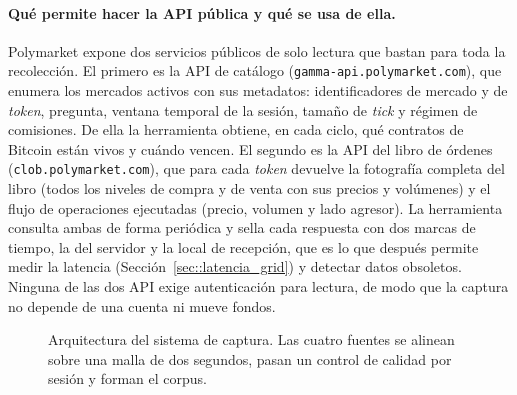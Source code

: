 \paragraph{Qué permite hacer la API pública y qué se usa de ella.} Polymarket expone dos
servicios públicos de solo lectura que bastan para toda la recolección. El primero es la API
de catálogo (\texttt{gamma-api.polymarket.com}), que enumera los mercados activos con sus
metadatos: identificadores de mercado y de \emph{token}, pregunta, ventana temporal de la
sesión, tamaño de \emph{tick} y régimen de comisiones. De ella la herramienta obtiene, en
cada ciclo, qué contratos de Bitcoin están vivos y cuándo vencen. El segundo es la API del
libro de órdenes (\texttt{clob.polymarket.com}), que para cada \emph{token} devuelve la
fotografía completa del libro (todos los niveles de compra y de venta con sus precios y
volúmenes) y el flujo de operaciones ejecutadas (precio, volumen y lado agresor). La
herramienta consulta ambas de forma periódica y sella cada respuesta con dos marcas de
tiempo, la del servidor y la local de recepción, que es lo que después permite medir la
latencia (Sección~\ref{sec::latencia_grid}) y detectar datos obsoletos. Ninguna de las dos
API exige autenticación para lectura, de modo que la captura no depende de una cuenta ni
mueve fondos.

\begin{figure}[h]
\centering
{}
\caption[Arquitectura del sistema de captura]{Arquitectura del sistema de captura. Las cuatro fuentes se alinean sobre una malla
de dos segundos, pasan un control de calidad por sesión y forman el corpus.}
\label{fig:captura}
\end{figure}

